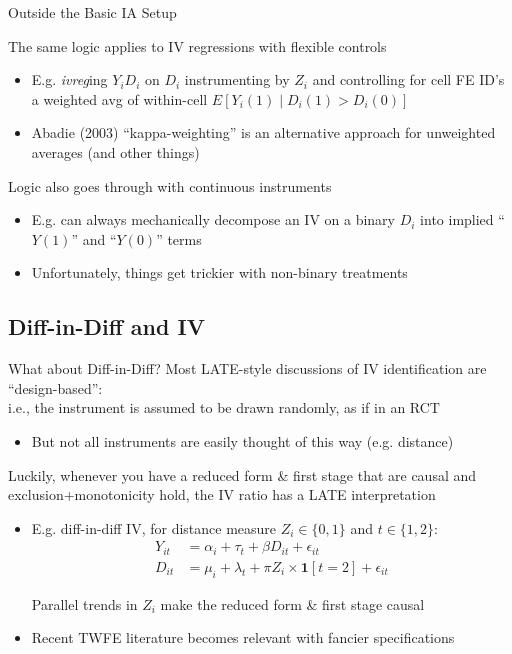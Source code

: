 \documentclass{beamer}
\begin{document}
\begin{frame}{Outside the Basic IA Setup}

The same logic applies to IV regressions with flexible controls \smallskip
\begin{itemize}
\item E.g. \emph{ivreg}ing $Y_iD_i$ on $D_i$ instrumenting by $Z_i$ and controlling for cell FE ID's a weighted avg of within-cell $E[Y_i(1)\mid D_i(1)>D_i(0)]$\smallskip\pause{}
\item Abadie (2003) ``kappa-weighting'' is an alternative approach for unweighted averages (and other things)
\end{itemize}\bigskip\pause{}

Logic also goes through with continuous instruments\smallskip
\begin{itemize}
\item E.g. can always mechanically decompose an IV on a binary $D_i$ into implied ``$Y(1)$'' and ``$Y(0)$'' terms
\item Unfortunately, things get trickier with non-binary treatments
\end{itemize}

\end{frame}

\subsection{Diff-in-Diff and IV}

\begin{frame}{What about Diff-in-Diff?}
Most LATE-style discussions of IV identification are ``design-based'': \\ i.e., the instrument is assumed to be drawn randomly, as if in an RCT 
\begin{itemize}
\item But not all instruments are easily thought of this way (e.g. distance)
\end{itemize}\medskip\pause{}

Luckily, whenever you have a reduced form \& first stage that are causal and exclusion+monotonicity hold, the IV ratio has a LATE interpretation
\begin{itemize}
\item E.g. diff-in-diff IV, for distance measure $Z_i\in\{0,1\}$ and $t\in\{1,2\}$:
\vspace{-0.4cm}
\begin{align*}
Y_{it}&=\alpha_i + \tau_t + \beta D_{it} + \epsilon_{it} \\
D_{it}&=\mu_i + \lambda_t + \pi Z_{i}\times\mathbf{1}[t=2] + \epsilon_{it}
\end{align*}
\vspace{-1cm}

Parallel trends in $Z_i$ make the reduced form \& first stage causal\pause{}
\item Recent TWFE literature becomes relevant with fancier specifications
\end{itemize}
\end{frame}
\end{document}
